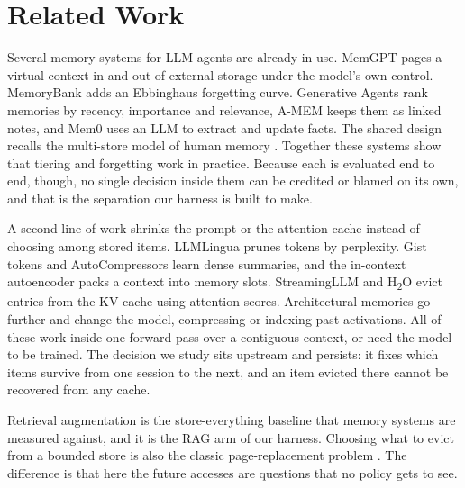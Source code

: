\section{Related Work}
\label{sec:related}

Several memory systems for LLM agents are already in use. MemGPT
\cite{packer2023memgpt} pages a virtual context in and out of external storage
under the model's own control. MemoryBank \cite{zhong2024memorybank} adds an
Ebbinghaus forgetting curve. Generative Agents \cite{park2023generative} rank
memories by recency, importance and relevance, A-MEM \cite{xu2025amem} keeps
them as linked notes, and Mem0 \cite{chhikara2025mem0} uses an LLM to extract
and update facts. The shared design recalls the multi-store model of human
memory \cite{atkinson1968memory}. Together these systems show that tiering and
forgetting work in practice. Because each is evaluated end to end, though, no
single decision inside them can be credited or blamed on its own, and that is
the separation our harness is built to make.

A second line of work shrinks the prompt or the attention cache instead of
choosing among stored items. LLMLingua \cite{jiang2023llmlingua} prunes tokens
by perplexity. Gist tokens \cite{mu2023gist} and AutoCompressors
\cite{chevalier2023autocompressor} learn dense summaries, and the in-context
autoencoder \cite{ge2024icae} packs a context into memory slots. StreamingLLM
\cite{xiao2024streaming} and H\textsubscript{2}O \cite{zhang2023h2o} evict
entries from the KV cache using attention scores. Architectural memories go
further and change the model, compressing \cite{rae2020compressive} or
indexing \cite{wu2022memorizing,wang2023longmem} past activations. All of these
work inside one forward pass over a contiguous context, or need the model to
be trained. The decision we study sits upstream and persists: it fixes which
items survive from one session to the next, and an item evicted there cannot
be recovered from any cache.

Retrieval augmentation \cite{lewis2020rag,karpukhin2020dpr,borgeaud2022retro}
is the store-everything baseline that memory systems are measured against, and
it is the RAG arm of our harness. Choosing what to evict from a bounded store
is also the classic page-replacement problem
\cite{belady1966replacement,denning1968workingset}. The difference is that
here the future accesses are questions that no policy gets to see.

